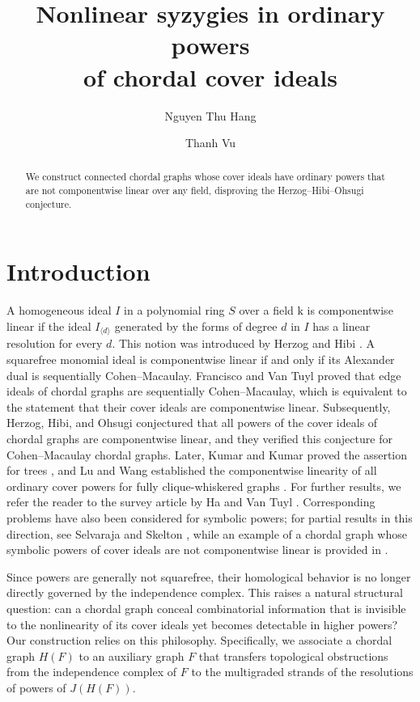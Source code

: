 \documentclass[12pt]{amsart}
\title[Nonlinear syzygies of chordal cover powers]{Nonlinear syzygies in ordinary powers\\of chordal cover ideals}
\author[N.T. Hang]{Nguyen Thu Hang}
\author{Thanh Vu}
\theoremstyle{definition}
\theoremstyle{remark}
\begin{document}
\begin{abstract}
We construct connected chordal graphs whose cover ideals have ordinary powers that are not componentwise linear over any field, disproving the Herzog--Hibi--Ohsugi conjecture.
\end{abstract}

\maketitle

\section{Introduction}
A homogeneous ideal $I$ in a polynomial ring $S$ over a field $\mathrm{k}$ is componentwise linear if the ideal $I_{\langle d \rangle}$ generated by the forms of degree $d$ in $I$ has a linear resolution for every $d$. This notion was introduced by Herzog and Hibi \cite{HH}. A squarefree monomial ideal is componentwise linear if and only if its Alexander dual is sequentially Cohen--Macaulay. Francisco and Van Tuyl \cite{FV} proved that edge ideals of chordal graphs are sequentially Cohen--Macaulay, which is equivalent to the statement that their cover ideals are componentwise linear. Subsequently, Herzog, Hibi, and Ohsugi \cite[Conjecture~2.5]{HHO} conjectured that all powers of the cover ideals of chordal graphs are componentwise linear, and they verified this conjecture for Cohen--Macaulay chordal graphs. Later, Kumar and Kumar proved the assertion for trees \cite{KK}, and Lu and Wang established the componentwise linearity of all ordinary cover powers for fully clique-whiskered graphs \cite{LW}. For further results, we refer the reader to the survey article by Ha and Van Tuyl \cite{HaVT}. Corresponding problems have also been considered for symbolic powers; for partial results in this direction, see Selvaraja and Skelton \cite{SS}, while an example of a chordal graph whose symbolic powers of cover ideals are not componentwise linear is provided in \cite[Remark~5.12]{DHNT}.

Since powers are generally not squarefree, their homological behavior is no longer directly governed by the independence complex. This raises a natural structural question: can a chordal graph conceal combinatorial information that is invisible to the nonlinearity of its cover ideals yet becomes detectable in higher powers? Our construction relies on this philosophy. Specifically, we associate a chordal graph $H(F)$ to an auxiliary graph $F$ that transfers topological obstructions from the independence complex of $F$ to the multigraded strands of the resolutions of powers of $J(H(F))$.
\end{document}
